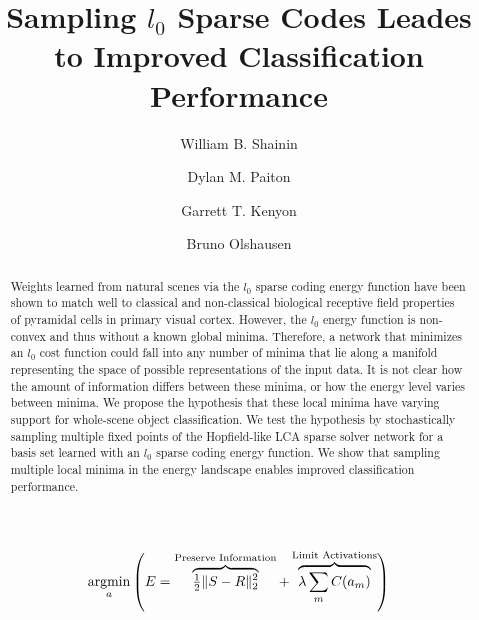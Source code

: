 \documentclass[smallextended]{svjour3}       %
\newcommand{\argmin}{\operatornamewithlimits{argmin}}
\begin{document}
\title{Sampling $l_0$ Sparse Codes Leades to Improved Classification Performance
}



\author{William B. Shainin \and
        Dylan M. Paiton \and
        Garrett T. Kenyon \and
        Bruno Olshausen}





\date{}

\maketitle

\begin{abstract}
Weights learned from natural scenes via the $l_{0}$ sparse coding energy function have been shown to match well to classical and non-classical biological receptive field properties of pyramidal cells in primary visual cortex. However, the $l_{0}$ energy function is non-convex and thus without a known global minima. Therefore, a network that minimizes an $l_{0}$ cost function could fall into any number of minima that lie along a manifold representing the space of possible representations of the input data. It is not clear how the amount of information differs between these minima, or how the energy level varies between minima. We propose the hypothesis that these local minima have varying support for whole-scene object classification. We test the hypothesis by stochastically sampling multiple fixed points of the Hopfield-like LCA sparse solver network for a basis set learned with an $l_{0}$ sparse coding energy function. We show that sampling multiple local minima in the energy landscape enables improved classification performance.
\end{abstract}

\begin{equation}
    \argmin\limits_{a}
        \left( E = 
            \overbrace{ \tfrac{1}{2} \| S - R \|_{2}^{2} }^\text{Preserve Information} +
        \overbrace{ \lambda \sum\limits_{m}C(a_{m}) }^\text{Limit Activations} \right)
\label{energyfunc}
\end{equation}
\end{document}
